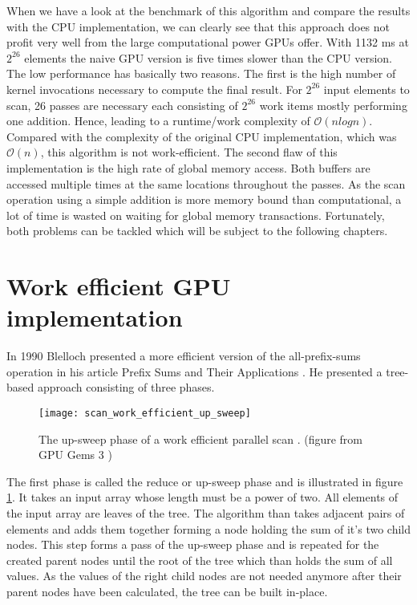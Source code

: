 When we have a look at the benchmark of this algorithm and compare the results with the CPU implementation, we can clearly see that this approach does not profit very well from the large computational power GPUs offer. With 1132 ms at $2^{26}$ elements the naive GPU version is five times slower than the CPU version. The low performance has basically two reasons. The first is the high number of kernel invocations necessary to compute the final result. For $2^{26}$ input elements to scan, 26 passes are necessary each consisting of $2^{26}$ work items mostly performing one addition. Hence, leading to a runtime/work complexity of $\mathcal{O}(n log n)$. Compared with the complexity of the original CPU implementation, which was $\mathcal{O}(n)$, this algorithm is not work-efficient. The second flaw of this implementation is the high rate of global memory access. Both buffers are accessed multiple times at the same locations throughout the passes. As the scan operation using a simple addition is more memory bound than computational, a lot of time is wasted on waiting for global memory transactions.
Fortunately, both problems can be tackled which will be subject to the following chapters.


\section{Work efficient GPU implementation}
\label{sec:scan_work_efficient}

In 1990 Blelloch presented a more efficient version of the all-prefix-sums operation in his article Prefix Sums and Their Applications \cite{scan_blelloch}. He presented a tree-based approach consisting of three phases.

\begin{figure}
\centering
\texttt{[image: scan\_work\_efficient\_up\_sweep]}
\caption{The up-sweep phase of a work efficient parallel scan \cite{scan_blelloch}.  (figure from GPU Gems 3 \cite{gpu_gems_3_chapter_39})}
\label{fig:scan_work_efficient_up_sweep}
\end{figure}

The first phase is called the reduce or up-sweep phase and is illustrated in figure \ref{fig:scan_work_efficient_up_sweep}. It takes an input array whose length must be a power of two. All elements of the input array are leaves of the tree. The algorithm than takes adjacent pairs of elements and adds them together forming a node holding the sum of it's two child nodes. This step forms a pass of the up-sweep phase and is repeated for the created parent nodes until the root of the tree which than holds the sum of all values. As the values of the right child nodes are not needed anymore after their parent nodes have been calculated, the tree can be built in-place.

